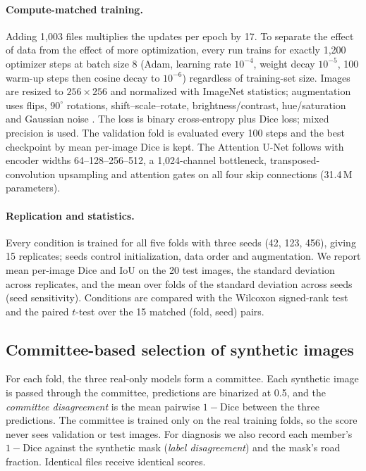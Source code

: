\documentclass[11pt]{article}
\begin{document}
\paragraph{Compute-matched training.} Adding 1{,}003 files multiplies the updates per epoch by 17. To separate the effect of data from the effect of more optimization, every run trains for exactly 1{,}200 optimizer steps at batch size 8 (Adam, learning rate $10^{-4}$, weight decay $10^{-5}$, 100 warm-up steps then cosine decay to $10^{-6}$) regardless of training-set size. Images are resized to $256\times256$ and normalized with ImageNet statistics; augmentation uses flips, $90^\circ$ rotations, shift--scale--rotate, brightness/contrast, hue/saturation and Gaussian noise \citep{buslaev2020}. The loss is binary cross-entropy plus Dice loss; mixed precision is used. The validation fold is evaluated every 100 steps and the best checkpoint by mean per-image Dice is kept. The Attention U-Net follows \citet{oktay2018} with encoder widths 64--128--256--512, a 1{,}024-channel bottleneck, transposed-convolution upsampling and attention gates on all four skip connections (31.4\,M parameters).

\paragraph{Replication and statistics.} Every condition is trained for all five folds with three seeds (42, 123, 456), giving 15 replicates; seeds control initialization, data order and augmentation. We report mean per-image Dice and IoU on the 20 test images, the standard deviation across replicates, and the mean over folds of the standard deviation across seeds (seed sensitivity). Conditions are compared with the Wilcoxon signed-rank test and the paired $t$-test over the 15 matched (fold, seed) pairs.

\subsection{Committee-based selection of synthetic images}

For each fold, the three real-only models form a committee. Each synthetic image is passed through the committee, predictions are binarized at 0.5, and the \emph{committee disagreement} is the mean pairwise $1-\mathrm{Dice}$ between the three predictions. The committee is trained only on the real training folds, so the score never sees validation or test images. For diagnosis we also record each member's $1-\mathrm{Dice}$ against the synthetic mask (\emph{label disagreement}) and the mask's road fraction. Identical files receive identical scores.
\end{document}

